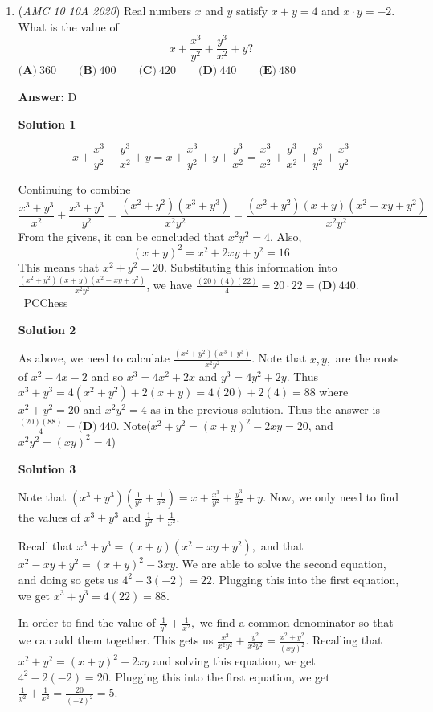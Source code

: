 \begin{enumerate}
 - curiousmind888 & TGSN

 On The Spot STEM

 


	\item (\textit{AMC 10 10A 2020}) Real numbers $x$ and $y$ satisfy $x + y = 4$ and $x \cdot y = -2$. What is the value of
 \[x + \frac{x^3}{y^2} + \frac{y^3}{x^2} + y?\]$\textbf{(A)}\ 360\qquad\textbf{(B)}\ 400\qquad\textbf{(C)}\ 420\qquad\textbf{(D)}\ 440\qquad\textbf{(E)}\ 480$

 \textbf{Answer: }D



\textbf{Solution 1}


 \[x + \frac{x^3}{y^2} + \frac{y^3}{x^2} + y=x+\frac{x^3}{y^2}+y+\frac{y^3}{x^2}=\frac{x^3}{x^2}+\frac{y^3}{x^2}+\frac{y^3}{y^2}+\frac{x^3}{y^2}\]

 Continuing to combine 
 \[\frac{x^3+y^3}{x^2}+\frac{x^3+y^3}{y^2}=\frac{(x^2+y^2)(x^3+y^3)}{x^2y^2}=\frac{(x^2+y^2)(x+y)(x^2-xy+y^2)}{x^2y^2}\]From the givens, it can be concluded that $x^2y^2=4$. Also, 
 \[(x+y)^2=x^2+2xy+y^2=16\] This means that $x^2+y^2=20$. Substituting this information into $\frac{(x^2+y^2)(x+y)(x^2-xy+y^2)}{x^2y^2}$, we have $\frac{(20)(4)(22)}{4}=20\cdot 22=\boxed{\textbf{(D)}\ 440}$. ~PCChess

 



\textbf{Solution 2}

As above, we need to calculate $\frac{(x^2+y^2)(x^3+y^3)}{x^2y^2}$. Note that $x,y,$ are the roots of $x^2-4x-2$ and so $x^3=4x^2+2x$ and $y^3=4y^2+2y$. Thus $x^3+y^3=4(x^2+y^2)+2(x+y)=4(20)+2(4)=88$ where $x^2+y^2=20$ and $x^2y^2=4$ as in the previous solution. Thus the answer is $\frac{(20)(88)}{4}=\boxed{\textbf{(D)}\ 440}$. Note($x^2+y^2=(x+y)^2-2xy=20$, and $x^2y^2 = (xy)^2 = 4$)

 



\textbf{Solution 3}

Note that $( x^3 + y^3 ) ( \frac{1}{y^2} + \frac{1}{x^2} ) = x + \frac{x^3}{y^2} + \frac{y^3}{x^2} + y.$ Now, we only need to find the values of $x^3 + y^3$ and $\frac{1}{y^2} + \frac{1}{x^2}.$ 

Recall that $x^3 + y^3 = (x + y) (x^2 - xy + y^2),$ and that $x^2 - xy + y^2 = (x + y)^2 - 3xy.$ We are able to solve the second equation, and doing so gets us $4^2 - 3(-2) = 22.$ Plugging this into the first equation, we get $x^3 + y^3 = 4(22) = 88.$ 

In order to find the value of $\frac{1}{y^2} + \frac{1}{x^2},$ we find a common denominator so that we can add them together. This gets us $\frac{x^2}{x^2 y^2} + \frac{y^2}{x^2 y^2} = \frac{x^2 + y^2}{(xy)^2}.$ Recalling that $x^2 + y^2 = (x+y)^2 - 2xy$ and solving this equation, we get $4^2 - 2(-2) = 20.$ Plugging this into the first equation, we get $\frac{1}{y^2} + \frac{1}{x^2} = \frac{20}{(-2)^2} = 5.$ 


\end{enumerate}
